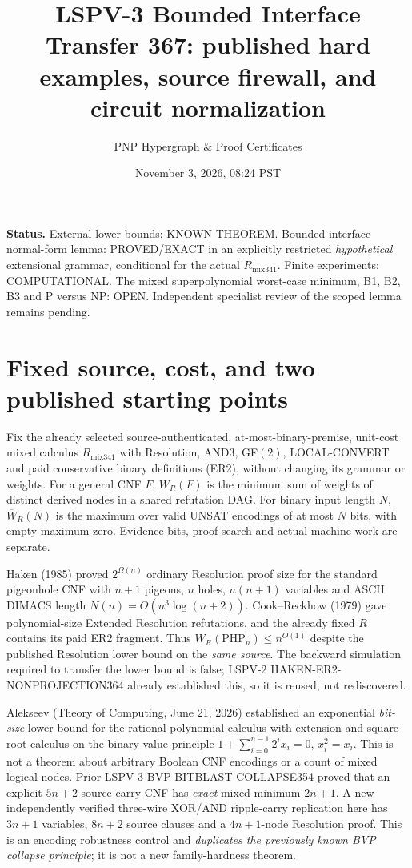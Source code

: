 \documentclass[11pt]{article}
\title{LSPV-3 Bounded Interface Transfer 367: published hard examples, source firewall, and circuit normalization}
\author{PNP Hypergraph \& Proof Certificates}
\date{November 3, 2026, 08:24 PST}
\begin{document}
\maketitle
\noindent\textbf{Status.} External lower bounds: KNOWN THEOREM. Bounded-interface normal-form lemma: PROVED/EXACT in an explicitly restricted \emph{hypothetical} extensional grammar, conditional for the actual $R_{\mathrm{mix341}}$. Finite experiments: COMPUTATIONAL. The mixed superpolynomial worst-case minimum, B1, B2, B3 and P versus NP: OPEN. Independent specialist review of the scoped lemma remains pending.

\section*{Fixed source, cost, and two published starting points}
Fix the already selected source-authenticated, at-most-binary-premise, unit-cost mixed calculus $R_{\mathrm{mix341}}$ with Resolution, AND3, GF$(2)$, LOCAL-CONVERT and paid conservative binary definitions (ER2), without changing its grammar or weights. For a general CNF $F$, $W_R(F)$ is the minimum sum of weights of distinct derived nodes in a shared refutation DAG. For binary input length $N$, $\overline W_R(N)$ is the maximum over valid UNSAT encodings of at most $N$ bits, with empty maximum zero. Evidence bits, proof search and actual machine work are separate.

Haken (1985) proved $2^{\Omega(n)}$ ordinary Resolution proof size for the standard pigeonhole CNF with $n+1$ pigeons, $n$ holes, $n(n+1)$ variables and ASCII DIMACS length $N(n)=\Theta(n^3\log(n+2))$. Cook--Reckhow (1979) gave polynomial-size Extended Resolution refutations, and the already fixed $R$ contains its paid ER2 fragment. Thus $W_R(\mathrm{PHP}_n)\le n^{O(1)}$ despite the published Resolution lower bound on the \emph{same source}. The backward simulation required to transfer the lower bound is false; LSPV-2 HAKEN-ER2-NONPROJECTION364 already established this, so it is reused, not rediscovered.

Alekseev (Theory of Computing, June 21, 2026) established an exponential \emph{bit-size} lower bound for the rational polynomial-calculus-with-extension-and-square-root calculus on the binary value principle $1+\sum_{i=0}^{n-1}2^ix_i=0$, $x_i^2=x_i$. This is not a theorem about arbitrary Boolean CNF encodings or a count of mixed logical nodes. Prior LSPV-3 BVP-BITBLAST-COLLAPSE354 proved that an explicit $5n+2$-source carry CNF has \emph{exact} mixed minimum $2n+1$. A new independently verified three-wire XOR/AND ripple-carry replication here has $3n+1$ variables, $8n+2$ source clauses and a $4n+1$-node Resolution proof. This is an encoding robustness control and \emph{duplicates the previously known BVP collapse principle}; it is not a new family-hardness theorem.
\end{document}
